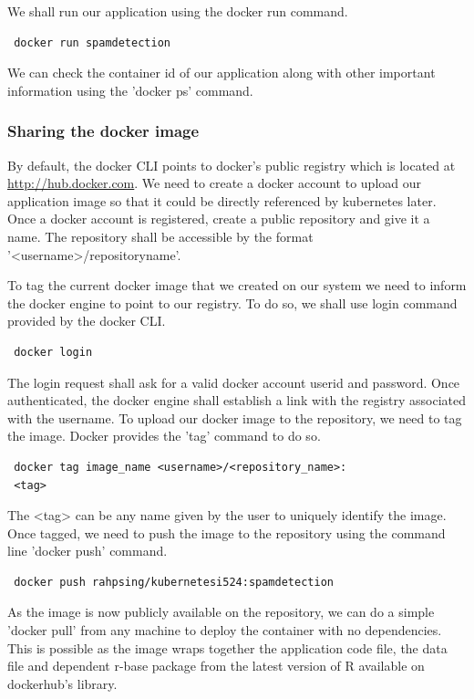 \documentclass[9pt,twocolumn,twoside]{../../styles/osajnl}
\begin{document}
We shall run our application using the docker run command.

\begin{verbatim}
 docker run spamdetection
\end{verbatim}

We can check the container id of our application along with other
important information using the 'docker ps' command.
 
\subsubsection{Sharing the docker image}

By default, the docker CLI points to docker's public registry which is
located at \url{http://hub.docker.com}. We need to create a docker
account to upload our application image so that it could be directly
referenced by kubernetes later. Once a docker account is registered,
create a public repository and give it a name. The repository shall be
accessible by the format '<username>/repositoryname'.

To tag the current docker image that we created on our system we need
to inform the docker engine to point to our registry. To do so, we
shall use login command provided by the docker CLI.

\begin{verbatim}
 docker login
\end{verbatim}

The login request shall ask for a valid docker account userid and
password. Once authenticated, the docker engine shall establish a link
with the registry associated with the username.  To upload our docker
image to the repository, we need to tag the image. Docker provides the
'tag' command to do so.

\begin{verbatim}
 docker tag image_name <username>/<repository_name>:
 <tag>
\end{verbatim}

The <tag> can be any name given by the user to uniquely identify the
image. Once tagged, we need to push the image to the repository using
the command line 'docker push' command.

\begin{verbatim}
 docker push rahpsing/kubernetesi524:spamdetection
\end{verbatim}


As the image is now publicly available on the repository, we can do a
simple 'docker pull' from any machine to deploy the container with no
dependencies. This is possible as the image wraps together the
application code file, the data file and dependent r-base package from
the latest version of R available on dockerhub's library.
\end{document}
